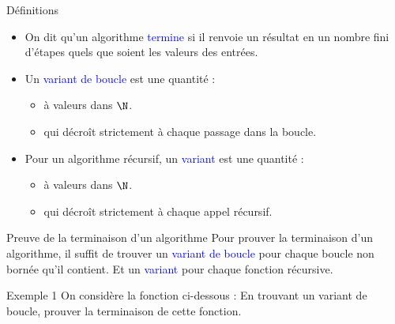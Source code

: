\documentclass[10pt]{beamer}
\begin{document}
\begin{frame}[fragile]{\Ctitle}{\stitle}
\begin{block}{Définitions}
    \begin{itemize}
        \item On dit qu'un algorithme \textcolor{blue}{termine} si il renvoie un résultat en un nombre fini d'étapes quels que soient les valeurs des entrées.
        \item Un \textcolor{blue}{variant de boucle} est une quantité :
            \begin{itemize}
            \item à valeurs dans $\N$.
            \item qui décroît strictement à chaque passage dans la boucle.
            \end{itemize}
        \item Pour un algorithme récursif, un \textcolor{blue}{variant} est une quantité :
        \begin{itemize}
            \item à valeurs dans $\N$.
            \item qui décroît strictement à chaque appel récursif.
        \end{itemize}
    \end{itemize}
\end{block}
\begin{alertblock}{Preuve de la terminaison d'un algorithme}
    Pour prouver la terminaison d'un algorithme, il suffit de trouver un \textcolor{blue}{variant de boucle} pour chaque boucle non bornée qu'il contient. Et un \textcolor{blue}{variant} pour chaque fonction récursive.
\end{alertblock}
\end{frame}

\begin{frame}[fragile]{\Ctitle}{\stitle}
\begin{exampleblock}{Exemple 1}
    On considère la fonction ci-dessous :
     En trouvant un variant de boucle, prouver la terminaison de cette fonction.
\end{exampleblock}
\end{frame}
\end{document}
